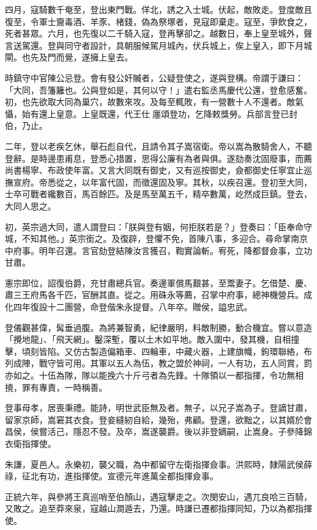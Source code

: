 \begin{pinyinscope}
四月，寇騎數千奄至，登出東門戰。佯北，誘之入士城。伏起，敵敗走。登度敵且復至，令軍士齎毒酒、羊豕、楮錢，偽為祭塚者，見寇即棄走。寇至，爭飲食之，死者甚眾。六月，也先復以二千騎入寇，登再擊卻之。越數日，奉上皇至城外，聲言送駕還。登與同守者設計，具朝服候駕月城內，伏兵城上，俟上皇入，即下月城閘。也先及門而覺，遂擁上皇去。

時鎮守中官陳公忌登。會有發公奸贓者，公疑登使之，遂與登構。帝謂于謙曰：「大同，吾籓籬也。公與登如是，其何以守！」遣右監丞馬慶代公還，登愈感奮。初，也先欲取大同為巢穴，故數來攻。及每至輒敗，有一營數十人不還者。敵氣懾，始有還上皇意。上皇既還，代王仕廛頌登功，乞降敕獎勞。兵部言登已封伯，乃止。

二年，登以老疾乞休，舉石彪自代，且請令其子嵩宿衛。帝以嵩為散騎舍人，不聽登辭。是時邊患甫息，登悉心措置，思得公廉有為者與俱。遂劾奏沈固廢事，而薦尚書楊寧、布政使年富。又言大同既有御史，又有巡按御史，僉都御史任寧宜止巡撫宣府。帝悉從之，以年富代固，而徵還固及寧。其秋，以疾召還。登初至大同，士卒可戰者纔數百，馬百餘匹。及是馬至萬五千，精卒數萬，屹然成巨鎮。登去，大同人思之。

初，英宗過大同，遣人謂登曰：「朕與登有姻，何拒朕若是？」登奏曰：「臣奉命守城，不知其他。」英宗銜之。及復辟，登懼不免，首陳八事，多迎合。尋命掌南京中府事。明年召還。言官劾登結陳汝言獲召，鞫實論斬。宥死，降都督僉事，立功甘肅。

憲宗即位，詔復伯爵，充甘肅總兵官。奏邊軍償馬艱甚，至鬻妻子。乞借楚、慶、肅三王府馬各千匹，官酬其直。從之。用硃永等薦，召掌中府事，總神機營兵。成化四年復設十二團營，命登偕朱永提督。八年卒。贈侯，謚忠武。

登儀觀甚偉，髯垂過腹。為將兼智勇，紀律嚴明，料敵制勝，動合機宜。嘗以意造「攪地龍」、「飛天網」。鑿深塹，覆以土木如平地。敵入圍中，發其機，自相撞擊，頃刻皆陷。又仿古製造偏箱車、四輪車，中藏火器，上建旗幟，鉤環聯絡，布列成陣，戰守皆可用。其軍以五人為伍，教之盟於神祠，一人有功，五人同賞，罰亦如之。十伍為隊，隊以能挽六十斤弓者為先鋒。十隊領以一都指揮，令功無相撓，罪有專責，一時稱善。

登事母孝，居喪秉禮。能詩，明世武臣無及者。無子，以兄子嵩為子。登謫甘肅，留家京師，嵩窘其衣食。登妾縫紉自給，幾殆，弗顧。登還，欲黜之，以其婿於會昌侯，侯嘗活己，隱忍不發。及卒，嵩遂襲爵。後以非登嫡嗣，止嵩身。子參降錦衣衛指揮使。

朱謙，夏邑人。永樂初，襲父職，為中都留守左衛指揮僉事。洪熙時，隸陽武侯薛祿，征北有功，進指揮使。宣德元年進萬全都指揮僉事。

正統六年，與參將王真巡哨至伯顏山，遇寇擊走之。次閔安山，遇兀良哈三百騎，又敗之。追至莽來泉，寇越山澗遁去，乃還。時謙已遷都指揮同知，乃以為都指揮使。


\end{pinyinscope}
